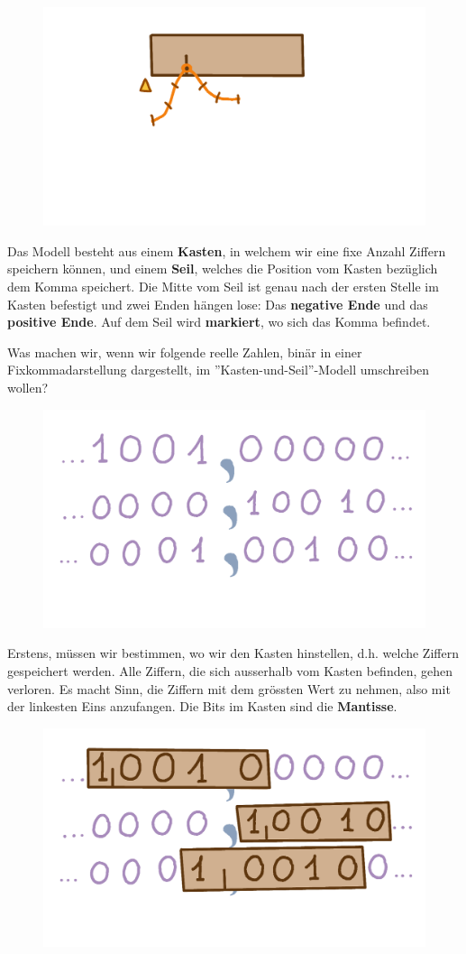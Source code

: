 \begin{figure}[H]
\centering
\includegraphics[width=0.75\linewidth]{Pictures/KastenOhneZahlen.png} 
\end{figure}

Das Modell besteht aus einem \textbf{Kasten}, in welchem wir eine fixe Anzahl Ziffern speichern können, und einem \textbf{Seil}, welches die Position vom Kasten bezüglich dem Komma speichert. Die Mitte vom Seil ist genau nach der ersten Stelle im Kasten befestigt und zwei Enden hängen lose: Das \textbf{negative Ende}  und das \textbf{positive Ende}. Auf dem Seil wird \textbf{markiert}, wo sich das Komma befindet.

Was machen wir, wenn wir folgende reelle Zahlen, binär in einer Fixkommadarstellung dargestellt, im ''Kasten-und-Seil''-Modell umschreiben wollen?

\begin{figure}[H]
\centering
\includegraphics[width=0.65\linewidth]{Pictures/Zahlengerade.png} 
\end{figure}

Erstens, müssen wir bestimmen, wo wir den Kasten hinstellen, d.h. welche Ziffern gespeichert werden. Alle Ziffern, die sich ausserhalb vom Kasten befinden, gehen verloren. Es macht Sinn, die Ziffern mit dem grössten Wert zu nehmen, also mit der linkesten Eins anzufangen. Die Bits im Kasten sind die \textbf{Mantisse}.

\begin{figure}[H]
\centering
\includegraphics[width=0.65\linewidth]{Pictures/Kasten.png} 
\end{figure}

